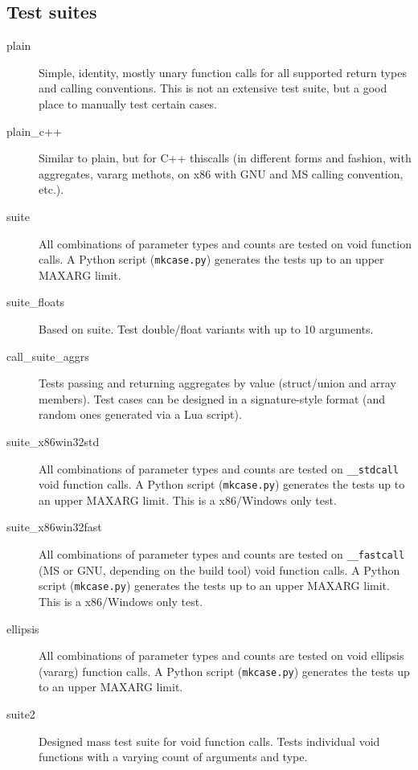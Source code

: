 \subsection{Test suites}

\begin{description}

\item [plain] 
Simple, identity, mostly unary function calls for all supported return types
and calling conventions. This is not an extensive test suite, but a good place
to manually test certain cases.

\item [plain\_c++] 
Similar to plain, but for C++ thiscalls (in different forms and fashion, with
aggregates, vararg methots, on x86 with GNU and MS calling convention, etc.).

\item [suite] 
All combinations of parameter types and counts are tested on void function
calls. A Python script ({\tt mkcase.py}) generates the tests up to
an upper MAXARG limit.

\item [suite\_floats]
Based on suite. Test double/float variants with up to 10 arguments.

\item [call\_suite\_aggrs]
Tests passing and returning aggregates by value (struct/union and array members).
Test cases can be designed in a signature-style format (and random ones generated
via a Lua script).

\item [suite\_x86win32std] 
All combinations of parameter types and counts are tested on {\tt \_\_stdcall}
void function calls. A Python script ({\tt mkcase.py}) generates
the tests up to an upper MAXARG limit. This is a x86/Windows only test.

\item [suite\_x86win32fast] 
All combinations of parameter types and counts are tested on {\tt \_\_fastcall}
(MS or GNU, depending on the build tool) void function calls.
A Python script ({\tt mkcase.py}) generates the tests up to
an upper MAXARG limit. This is a x86/Windows only test.

\item [ellipsis]
All combinations of parameter types and counts are tested on void ellipsis 
(vararg) function calls. A Python script ({\tt mkcase.py}) generates the 
tests up to an upper MAXARG limit.

\item [suite2]
Designed mass test suite for void function calls.
Tests individual void functions with a varying count of arguments and type.


\end{description}
